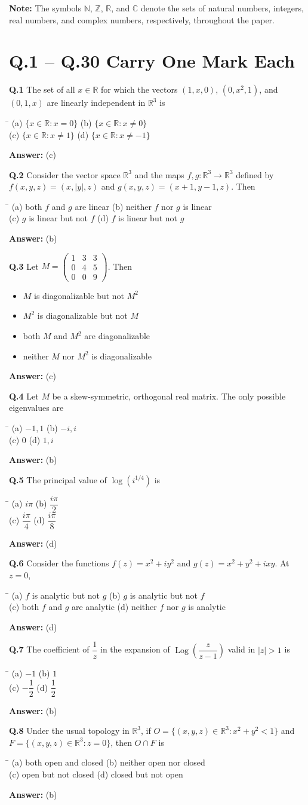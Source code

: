 \documentclass[11pt,a4paper]{article}
\newcommand{\optsfour}[4]{%
  \begin{tabbing}
    \hspace{0.48\linewidth}\=\kill
    (a) #1 \> (b) #2 \\[2pt]
    (c) #3 \> (d) #4
  \end{tabbing}%
}
\newcommand{\optslist}[4]{%
  \begin{itemize}
    \setlength{\itemsep}{2pt}\setlength{\parskip}{0pt}
    \item[(a)] #1
    \item[(b)] #2
    \item[(c)] #3
    \item[(d)] #4
  \end{itemize}%
}
\newcommand{\ans}[1]{\textbf{Answer:} #1\par\medskip}
\begin{document}
\medskip
\textbf{Note:} The symbols $\mathbb{N}$, $\mathbb{Z}$, $\mathbb{R}$, and $\mathbb{C}$ denote the sets of natural numbers, integers, real numbers, and complex numbers, respectively, throughout the paper.

\section*{Q.1 -- Q.30 Carry One Mark Each}

\textbf{Q.1} The set of all $x \in \mathbb{R}$ for which the vectors $(1, x, 0)$, $(0, x^2, 1)$, and $(0, 1, x)$ are linearly independent in $\mathbb{R}^3$ is
\optsfour{$\{x \in \mathbb{R} : x = 0\}$}{$\{x \in \mathbb{R} : x \ne 0\}$}{$\{x \in \mathbb{R} : x \ne 1\}$}{$\{x \in \mathbb{R} : x \ne -1\}$}
\ans{(c)}

\textbf{Q.2} Consider the vector space $\mathbb{R}^3$ and the maps $f, g : \mathbb{R}^3 \to \mathbb{R}^3$ defined by $f(x,y,z) = (x, |y|, z)$ and $g(x,y,z) = (x+1, y-1, z)$. Then
\optsfour{both $f$ and $g$ are linear}{neither $f$ nor $g$ is linear}{$g$ is linear but not $f$}{$f$ is linear but not $g$}
\ans{(b)}

\textbf{Q.3} Let $M = \begin{pmatrix} 1 & 3 & 3 \\ 0 & 4 & 5 \\ 0 & 0 & 9 \end{pmatrix}$. Then
\optslist{$M$ is diagonalizable but not $M^2$}{$M^2$ is diagonalizable but not $M$}{both $M$ and $M^2$ are diagonalizable}{neither $M$ nor $M^2$ is diagonalizable}
\ans{(c)}

\textbf{Q.4} Let $M$ be a skew-symmetric, orthogonal real matrix. The only possible eigenvalues are
\optsfour{$-1, 1$}{$-i, i$}{$0$}{$1, i$}
\ans{(b)}

\textbf{Q.5} The principal value of $\log(i^{1/4})$ is
\optsfour{$i\pi$}{$\dfrac{i\pi}{2}$}{$\dfrac{i\pi}{4}$}{$\dfrac{i\pi}{8}$}
\ans{(d)}

\textbf{Q.6} Consider the functions $f(z) = x^2 + iy^2$ and $g(z) = x^2 + y^2 + ixy$. At $z = 0$,
\optsfour{$f$ is analytic but not $g$}{$g$ is analytic but not $f$}{both $f$ and $g$ are analytic}{neither $f$ nor $g$ is analytic}
\ans{(d)}

\textbf{Q.7} The coefficient of $\dfrac{1}{z}$ in the expansion of $\operatorname{Log}\!\left(\dfrac{z}{z - 1}\right)$ valid in $|z| > 1$ is
\optsfour{$-1$}{$1$}{$-\dfrac{1}{2}$}{$\dfrac{1}{2}$}
\ans{(b)}

\textbf{Q.8} Under the usual topology in $\mathbb{R}^3$, if $O = \{(x,y,z) \in \mathbb{R}^3 : x^2 + y^2 < 1\}$ and $F = \{(x,y,z) \in \mathbb{R}^3 : z = 0\}$, then $O \cap F$ is
\optsfour{both open and closed}{neither open nor closed}{open but not closed}{closed but not open}
\ans{(b)}
\end{document}
